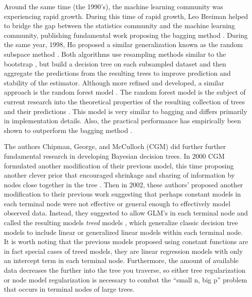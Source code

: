 Around the same time (the 1990's), the machine learning community was experiencing rapid growth. During this time of rapid growth, Leo Breiman helped to bridge the gap between the statistics community and the machine learning community, publishing fundamental work proposing the bagging method \cite{breiman1996bagging}. During the same year, 1998, Ho proposed a similar generalization known as the random subspace method \cite{ho1998random}. Both algorithms use resampling methods similar to the bootstrap \cite{efron1997improvements,efron1994introduction}, but build a decision tree on each subsampled dataset and then aggregate the predictions from the resulting trees to improve prediction and stability of the estimator. Although more refined and developed, a similar approach is the random forest model \cite{breiman2001random}. The random forest model is the subject of current research into the theoretical properties of the resulting collection of trees and their predictions \cite{biau2008consistency,biau2012analysis}.  This model is very similar to bagging and differs primarily in implementation details. Also, the practical performance has empirically been shown to outperform the bagging method \cite{breiman2001random}. 

The authors Chipman, George, and McCulloch (CGM) \cite{chipman1998bayesian} did further further fundamental research in developing Bayesian decision trees. In 2000 CGM formulated another modification of their previous model, this time proposing another clever prior that encouraged shrinkage and sharing of information by nodes close together in the tree \cite{chipman2000hierarchical}. Then in 2002, these authors' proposed another modification to their previous work suggesting that perhaps constant models in each terminal node were not effective or general enough to effectively model observed data. Instead, they suggested to allow GLM's in each terminal node and called the resulting models \emph{treed} models \cite{chipman2002bayesian}, which generalize classic decision tree models to include linear or generalized linear models within each terminal node. It is worth noting that the previous models proposed using constant functions are in fact special cases of treed models, they are linear regression models with only an intercept term in each terminal node. Furthermore, the amount of available data decreases the further into the tree you traverse, so either tree regularization or node model regularization is necessary to combat the ``small n, big p'' problem that occurs in terminal nodes of large trees. 

